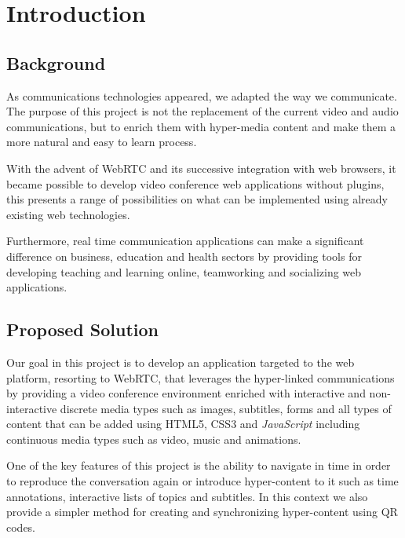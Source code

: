 \documentclass[conference,compsoc,a4paper]{IEEEtran}
\begin{document}
\IEEEpeerreviewmaketitle

\section{Introduction}
\label{chapter:introduction}

\subsection{Background}
\label{section:background}

	As communications technologies appeared, we adapted the way we communicate. The purpose of this project is not the replacement of the current video and audio communications, but to enrich them with hyper-media content and make them a more natural and easy to learn process. 

	With the advent of WebRTC and its successive integration with web browsers, it became possible to develop video conference web applications without plugins, this presents a range of possibilities on what can be implemented using already existing web technologies.
		
    Furthermore, real time communication applications can make a significant difference on business, education and health sectors by providing tools for developing teaching and learning online, teamworking and socializing web applications.

\subsection{Proposed Solution}
\label{section:proposed}

	Our goal in this project is to develop an application targeted to the web platform, resorting to \gls{WebRTC}, that leverages the hyper-linked communications by providing a video conference environment enriched with interactive and non-interactive discrete media types such as images, subtitles, forms and all types of content that can be added using \gls{HTML}5, \gls{CSS}3 and \emph{JavaScript} including continuous media types such as video, music and animations.

	One of the key features of this project is the ability to navigate in time in order to reproduce the conversation again or introduce hyper-content to it such as time annotations, interactive lists of topics and subtitles. In this context we also provide a simpler method for creating and synchronizing hyper-content using \gls{QR} codes.
\end{document}
